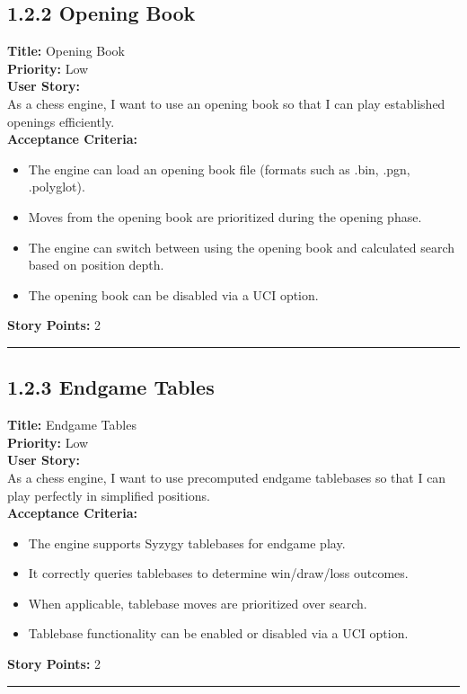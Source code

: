 \documentclass[12pt]{article}
\begin{document}
\subsection{1.2.2 Opening Book}
\textbf{Title:} Opening Book\\
\textbf{Priority:} Low\\
\textbf{User Story:}\\
As a chess engine, I want to use an opening book so that I can play established openings efficiently.\\
\textbf{Acceptance Criteria:}
\begin{itemize}
    \item The engine can load an opening book file (formats such as .bin, .pgn, .polyglot).
    \item Moves from the opening book are prioritized during the opening phase.
    \item The engine can switch between using the opening book and calculated search based on position depth.
    \item The opening book can be disabled via a UCI option.
\end{itemize}
\textbf{Story Points:} 2

\bigskip
\hrule
\bigskip

\newpage
\subsection{1.2.3 Endgame Tables}
\textbf{Title:} Endgame Tables\\
\textbf{Priority:} Low\\
\textbf{User Story:}\\
As a chess engine, I want to use precomputed endgame tablebases so that I can play perfectly in simplified positions.\\
\textbf{Acceptance Criteria:}
\begin{itemize}
    \item The engine supports Syzygy tablebases for endgame play.
    \item It correctly queries tablebases to determine win/draw/loss outcomes.
    \item When applicable, tablebase moves are prioritized over search.
    \item Tablebase functionality can be enabled or disabled via a UCI option.
\end{itemize}
\textbf{Story Points:} 2

\bigskip
\hrule
\bigskip
\end{document}
